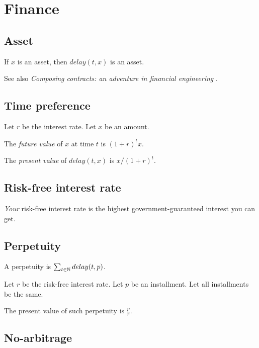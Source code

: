 \chapter{Finance}

\section{Asset}

If \(x\) is an asset,
then \(delay(t,x)\) is an asset.

See also \emph{Composing contracts: an adventure in financial engineering} \cite{SpjContract}.

\section{Time preference}

Let \(r\) be the interest rate.
Let \(x\) be an amount.

The \emph{future value} of \(x\) at time \(t\) is \((1+r)^t x\).

The \emph{present value} of \(delay(t,x)\) is \(x / (1+r)^t\).

\section{Risk-free interest rate}

\emph{Your} risk-free interest rate is
the highest government-guaranteed interest you can get.

\section{Perpetuity}

A perpetuity is \(\sum_{t \in \mathbb{N}} delay(t,p) \).

Let \(r\) be the risk-free interest rate.
Let \(p\) be an installment.
Let all installments be the same.

The present value of such perpetuity is \(\frac{p}{r}\).

\section{No-arbitrage}
